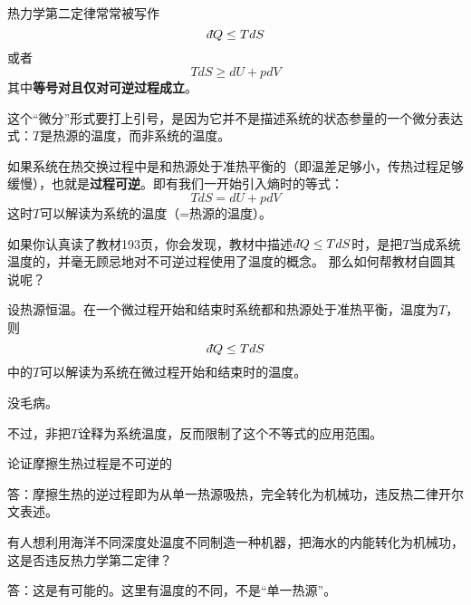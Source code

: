 \documentclass[CJK]{beamer}
\begin{document}
\begin{frame}
\bch
热力学第二定律常常被写作
{\blue $$\dbar Q \le TdS$$}
或者
{\blue $$ TdS \ge dU + pdV $$}
其中{\bf 等号对且仅对可逆过程成立}。

这个“微分”形式要打上引号，是因为它并不是描述系统的状态参量的一个微分表达式：$T$是热源的温度，而非系统的温度。

如果系统在热交换过程中是和热源处于准热平衡的（即温差足够小，传热过程足够缓慢），也就是{\bf 过程可逆}。即有我们一开始引入熵时的等式：
$$ TdS = dU + pdV$$
这时$T$可以解读为系统的温度（=热源的温度）。
\ech
\end{frame}

\begin{frame}
\bch
{}

如果你认真读了教材193页，你会发现，教材中描述$\dbar Q \le TdS$时，是把$T$当成系统温度的，并毫无顾忌地对不可逆过程使用了温度的概念\wulian。
那么如何帮教材自圆其说呢？

\ech
\end{frame}

\begin{frame}
\bch
设热源恒温。在一个微过程开始和结束时系统都和热源处于准热平衡，温度为$T$，则
$$\dbar Q \le TdS $$
中的$T$可以解读为系统在微过程开始和结束时的温度。

\skiplines

\bye 没毛病。


不过，非把$T$诠释为系统温度，反而限制了这个不等式的应用范围。
\ech
\end{frame}

\begin{frame}
\bch
{\blue 论证摩擦生热过程是不可逆的}

\skiplines

答：摩擦生热的逆过程即为从单一热源吸热，完全转化为机械功，违反热二律开尔文表述。

\ech
\end{frame}

\begin{frame}
\bch
{\blue 有人想利用海洋不同深度处温度不同制造一种机器，把海水的内能转化为机械功，这是否违反热力学第二定律？}


\skiplines

答：这是有可能的。这里有温度的不同，不是“单一热源”。
\ech
\end{frame}
\end{document}
